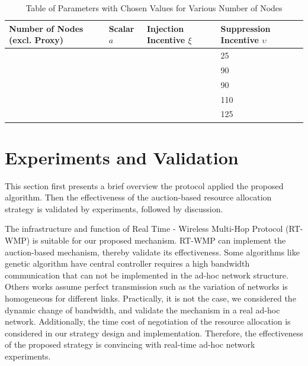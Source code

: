 \documentclass[journal]{IEEEtran}  %
\begin{document}
\begin{table}[htpb]
  \small
\caption{Table of Parameters with Chosen Values for Various Number of Nodes}
\label{tab:chosen_variable_values}
\begin{center}
\begin{tabular}{m{2.3cm}m{1cm}LL}
\toprule
\centering Number of Nodes (excl. Proxy) &  Scalar $a$ & Injection
Incentive $\xi$ & Suppression Incentive $\upsilon$\\ 
\midrule
{} &  &  &  25 \\ 
 &  &  &  90 \\ 
 &  &  &  90 \\ 
 &  &  &  110 \\ 
 &  &  &  125 \\ 
\bottomrule
\end{tabular} 
\end{center}
\end{table}


\section{Experiments and Validation}
\label{sec:inc_experiment}
This section first presents a brief overview the protocol applied the proposed
  algorithm. Then the effectiveness of the auction-based resource allocation
  strategy is validated by experiments, followed by discussion.

The infrastructure and function of Real Time - Wireless Multi-Hop Protocol
(RT-WMP) is suitable for our proposed mechanism.  RT-WMP can implement the
auction-based mechanism, thereby validate its effectiveness.
Some algorithms like genetic algorithm \cite{GA2011RA} have central controller
requires a high bandwidth communication that can not be implemented in the
ad-hoc network structure.
Others works assume perfect transmission \cite{ZavlDistAuc2008,Shao2014RRA} 
such as the variation of networks is homogeneous for different links.
Practically, it is not the case, we considered the dynamic change of
bandwidth, and validate the mechanism in a real ad-hoc network. 
Additionally, the time cost of negotiation of the resource allocation 
 is considered in our strategy design and implementation. 
Therefore, the effectiveness of the proposed strategy is convincing with
real-time ad-hoc network experiments. 
\end{document}
